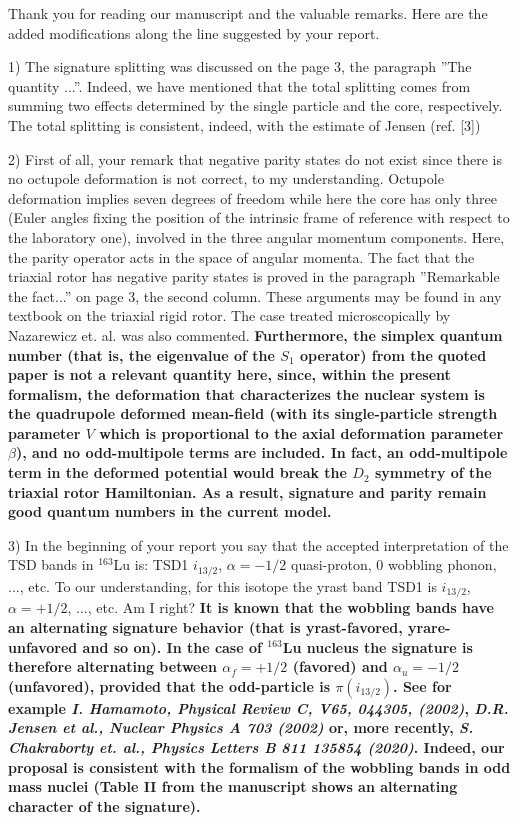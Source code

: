 \documentclass[11pt,a4paper]{article}
\begin{document}
Thank you for reading our manuscript and the valuable remarks. Here are the added modifications along the line suggested by your report.

1) The signature splitting was discussed on the page 3, the paragraph ”The quantity ...”. Indeed, we have mentioned that the total splitting comes from summing two effects determined by the single particle and the core, respectively. The total splitting is consistent, indeed, with the estimate of Jensen (ref. [3])

2) First of all, your remark that negative parity states do not exist since there is no octupole deformation is not correct, to my understanding. Octupole deformation implies seven degrees of freedom while here the core has only three (Euler angles fixing the position of the intrinsic frame of reference with respect to the laboratory one), involved in the three angular momentum components. Here, the parity operator acts in the space of angular momenta. The fact that the triaxial rotor has negative parity states is proved in the paragraph ”Remarkable the fact...” on page 3, the second column. These arguments may be found in any textbook on the triaxial rigid rotor. The case treated microscopically by Nazarewicz et. al. was also commented. \textbf{Furthermore, the simplex quantum number (that is, the eigenvalue of the $S_1$ operator) from the quoted paper is not a relevant quantity here, since, within the present formalism, the deformation that characterizes the nuclear system is the quadrupole deformed mean-field (with its single-particle strength parameter $V$ which is proportional to the axial deformation parameter $\beta$), and no odd-multipole terms are included. In fact, an odd-multipole term in the deformed potential would break the $D_2$ symmetry of the triaxial rotor Hamiltonian. As a result, signature and parity remain good quantum numbers in the current model.}

3) In the beginning of your report you say that the accepted interpretation of the TSD bands in $^{163}$Lu is: TSD1 $i_{13/2}$, $\alpha = -1/2$ quasi-proton, 0 wobbling phonon, ..., etc. To our understanding, for this isotope the yrast band TSD1 is $i_{13/2}$,  $\alpha= +1/2$, ..., etc. Am I right? \textbf{It is known that the wobbling bands have an alternating signature behavior (that is yrast-favored, yrare-unfavored and so on). In the case of $^{163}$Lu nucleus the signature is therefore alternating between $\alpha_f=+1/2$ (favored) and $\alpha_u=-1/2$ (unfavored), provided that the odd-particle is $\pi(i_{13/2})$. See for example \emph{I. Hamamoto, Physical Review C, V65, 044305, (2002)}, \emph{D.R. Jensen et al., Nuclear Physics A 703 (2002)} or, more recently, \emph{S. Chakraborty et. al., Physics Letters B 811 135854 (2020)}. Indeed, our proposal is consistent with the formalism of the wobbling bands in odd mass nuclei (Table II from the manuscript shows an alternating character of the signature).}
\end{document}
